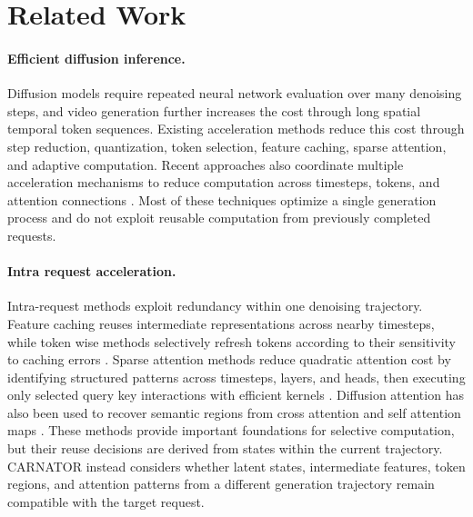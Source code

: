 \section{Related Work}

\paragraph{Efficient diffusion inference.}
Diffusion models require repeated neural network evaluation over many denoising steps, and video generation further increases the cost through long spatial temporal token sequences. Existing acceleration methods reduce this cost through step reduction, quantization, token selection, feature caching, sparse attention, and adaptive computation. Recent approaches also coordinate multiple acceleration mechanisms to reduce computation across timesteps, tokens, and attention connections \citep{liu2025astraea,zhao2026rapid}. Most of these techniques optimize a single generation process and do not exploit reusable computation from previously completed requests.

\paragraph{Intra request acceleration.}
Intra-request methods exploit redundancy within one denoising trajectory. Feature caching reuses intermediate representations across nearby timesteps, while token wise methods selectively refresh tokens according to their sensitivity to caching errors \citep{zou2024accelerating,liu2025speca}. Sparse attention methods reduce quadratic attention cost by identifying structured patterns across timesteps, layers, and heads, then executing only selected query key interactions with efficient kernels \citep{chen2026sparse}. Diffusion attention has also been used to recover semantic regions from cross attention and self attention maps \citep{tian2024diffuse}. These methods provide important foundations for selective computation, but their reuse decisions are derived from states within the current trajectory. CARNATOR instead considers whether latent states, intermediate features, token regions, and attention patterns from a different generation trajectory remain compatible with the target request.

